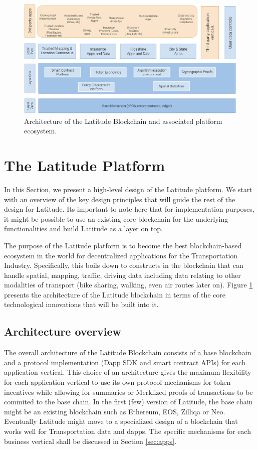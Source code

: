 \begin{figure}[t]
    \centering
    \includegraphics[width=1.00\textwidth]{lat-arch-2.png}
  \caption{Architecture of the Latitude Blockchain and associated platform ecosystem.}
    \label{fig:lat-arch}
\end{figure}

\section{The Latitude Platform}\label{sec:design}

In this Section, we present a high-level design of the Latitude platform.  We start with an overview of the key design
principles that will guide the rest of the design for Latitude. Its important to note here that for implementation
purposes, it might be possible to use an existing core blockchain for the underlying functionalities and build Latitude
as a layer on top.

The purpose of the Latitude platform is to become the best blockchain-based ecosystem in the world for decentralized
applications for the Transportation Industry. Specifically, this boils down to constructs in the blockchain that can
handle spatial, mapping, traffic, driving data including data relating to other modalities of transport (bike sharing,
walking, even air routes later on). Figure \ref{fig:lat-arch} presents the architecture of the Latitude blockchain in
terms of the core technological innovations that will be built into it.

\subsection{Architecture overview}

The overall architecture of the Latitude Blockchain consists of a base blockchain and a protocol implementation (Dapp
SDK and smart contract APIs) for each application vertical. This choice of an architecture gives the maximum flexibility
for each application vertical to use its own protocol mechanisms for token incentives while allowing for summaries or
Merklized proofs of transactions to be commited to the base chain. In the first (few) version of Latitude, the base
chain might be an existing blockchain such as Ethereum, EOS, Zilliqa or Neo. Eventually Latitude might move to a
specialized design of a blockchain that works well for Transportation data and dapps. The specific mechanisms for each
business vertical shall be discussed in Section \ref{sec:apps}.

